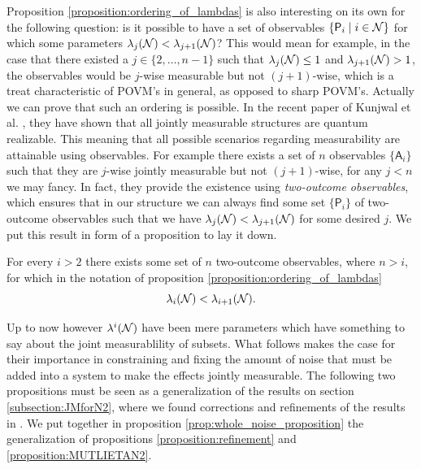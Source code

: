 \documentclass[10pt, a4paper]{amsart}
\begin{document}
Proposition \ref{proposition:ordering_of_lambdas} is also interesting on its own for the following question: is it possible to have a set of observables $\{\mathsf{P}_{i}\mid i\in\mathcal{N}\}$ for which some parameters $\lambda_{j}(\mathcal{N}) < \lambda
_{j+1}(\mathcal{N})$? This would mean for example, in the case that there existed a $j\in \{2, \ldots, n-1\}$ such that $\lambda_{j}(\mathcal{N}) \leq 1$ and $\lambda_{j+1}(\mathcal{N}) >1$, the observables would be $j$-wise measurable but not $(j+1)$-wise, which is a treat characteristic of POVM's in general, as opposed to sharp POVM's. Actually we can prove that such an ordering is possible. In the recent paper of Kunjwal et al. \cite{kunjwal2013all}, they have shown that all jointly measurable structures are quantum realizable. This meaning that all possible scenarios regarding measurability are attainable using observables. For example there exists a set of $n$ observables $\{\mathsf{A}_{i}\}$ such that they are $j$-wise jointly measurable but not $(j+1)$-wise, for any $j<n$ we may fancy.  In fact, they provide the existence using \textit{two-outcome observables}, which ensures that in our structure we can always find  some set $\{\mathsf{P}_{i}\}$ of two-outcome observables such that we have $\lambda_{j}(\mathcal{N}) < \lambda
_{j+1}(\mathcal{N})$ for some desired $j$. We put this result in form of a proposition to lay it down.

\begin{proposition}
For every $i>2$ there exists some set of $n$ two-outcome observables, where $n>i$, for which in the notation of proposition \ref{proposition:ordering_of_lambdas} 
$$
\lambda_{i}(\mathcal{N}) < \lambda_{i+1}(\mathcal{N}).
$$ 
\end{proposition}


Up to now however $\lambda^{i}(\mathcal{N})$ have been  mere parameters which have something to say about the joint measurablility of subsets. What follows makes the case for their importance in constraining and fixing the amount of noise that must be added into a system to make the effects jointly measurable. The following two propositions must be seen as a generalization of the results on section \ref{subsection:JMforN2}, where we found corrections and refinements of the results in \cite{wolfgarcia}. 
We put together in proposition \ref{prop:whole_noise_proposition} the generalization of propositions \ref{proposition:refinement} and \ref{proposition:MUTLIETAN2}. 
\end{document}
